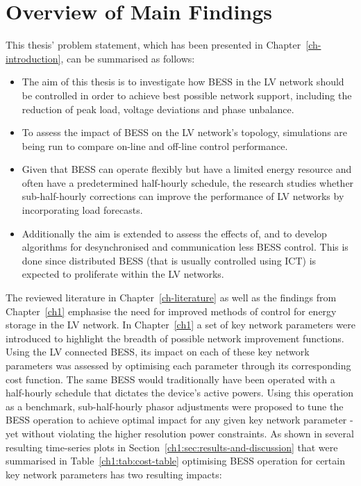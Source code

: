 \section{Overview of Main Findings}
\label{ch-conclusions:sec:main-findings}

This thesis' problem statement, which has been presented in Chapter~\ref{ch-introduction}, can be summarised as follows:

\begin{itemize}
	\item
	The aim of this thesis is to investigate how BESS in the LV network should be controlled in order to achieve best possible network support, including the reduction of peak load, voltage deviations and phase unbalance.
	\item 
	To assess the impact of BESS on the LV network's topology, simulations are being run to compare on-line and off-line control performance.
	\item
	Given that BESS can operate flexibly but have a limited energy resource and often have a predetermined half-hourly schedule, the research studies whether sub-half-hourly corrections can improve the performance of LV networks by incorporating load forecasts.
	\item
	Additionally the aim is extended to assess the effects of, and to develop algorithms for desynchronised and communication less BESS control.
	This is done since distributed BESS (that is usually controlled using ICT) is expected to proliferate within the LV networks.
\end{itemize}

The reviewed literature in Chapter~\ref{ch-literature} as well as the findings from Chapter~\ref{ch1} emphasise the need for improved methods of control for energy storage in the LV network.
In Chapter~\ref{ch1} a set of key network parameters were introduced to highlight the breadth of possible network improvement functions.
Using the LV connected BESS, its impact on each of these key network parameters was assessed by optimising each parameter through its corresponding cost function.
The same BESS would traditionally have been operated with a half-hourly schedule that dictates the device's active powers.
Using this operation as a benchmark, sub-half-hourly phasor adjustments were proposed to tune the BESS operation to achieve optimal impact for any given key network parameter - yet without violating the higher resolution power constraints.
As shown in several resulting time-series plots in Section~\ref{ch1:sec:results-and-discussion} that were summarised in Table~\ref{ch1:tab:cost-table} optimising BESS operation for certain key network parameters has two resulting impacts:

